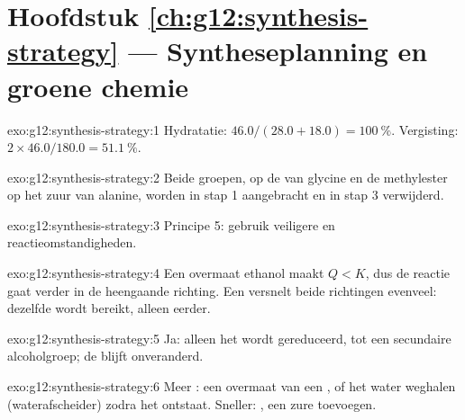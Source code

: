 \section*{Hoofdstuk \ref{ch:g12:synthesis-strategy} --- Syntheseplanning en groene chemie}

\begin{solution}{exo:g12:synthesis-strategy:1}
Hydratatie: $46.0/(28.0 + 18.0) = \qty{100}{\percent}$. Vergisting:
$2 \times 46.0/180.0 = \qty{51.1}{\percent}$.
\end{solution}

\begin{solution}{exo:g12:synthesis-strategy:2}
Beide groepen,  op de  van glycine en de methylester op het
zuur van alanine, worden in stap 1 aangebracht en in stap 3 verwijderd.
\end{solution}

\begin{solution}{exo:g12:synthesis-strategy:3}
Principe 5: gebruik veiligere  en reactieomstandigheden.
\end{solution}

\begin{solution}{exo:g12:synthesis-strategy:4}
Een overmaat ethanol maakt $Q < K$, dus de reactie gaat verder in de
heengaande richting. Een  versnelt beide richtingen evenveel:
dezelfde  wordt bereikt, alleen eerder.
\end{solution}

\begin{solution}{exo:g12:synthesis-strategy:5}
Ja: alleen het  wordt gereduceerd, tot een secundaire alcoholgroep;
de  blijft onveranderd.
\end{solution}

\begin{solution}{exo:g12:synthesis-strategy:6}
Meer : een overmaat van een , of het water weghalen
(waterafscheider) zodra het ontstaat. Sneller: , een zure  toevoegen.
\end{solution}

